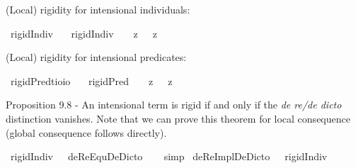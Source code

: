 \begin{isabellebody}
\begin{isamarkuptext}
(Local) rigidity for intensional individuals:%
\end{isamarkuptext}\isamarkuptrue%
\isamarkupfalse%
\ rigidIndiv{\isacharcolon}{\isacharcolon}{\isachardoublequoteopen}{\isasymup}{\isasymlangle}{\isasymup}{\isasymzero}{\isasymrangle}{\isachardoublequoteclose}\ \isanewline
\ \ {\isachardoublequoteopen}rigidIndiv\ {\isasymtau}\ {\isasymequiv}\ {\isacharparenleft}{\isasymlambda}{\isasymbeta}{\isachardot}\ \isactrlbold {\isasymbox}{\isacharparenleft}{\isacharparenleft}{\isasymlambda}z{\isachardot}\ {\isasymbeta}\ \isactrlbold {\isasymapprox}\ z{\isacharparenright}\ \isactrlbold {\isasymdownharpoonleft}{\isasymtau}{\isacharparenright}{\isacharparenright}\ \isactrlbold {\isasymdownharpoonleft}{\isasymtau}{\isachardoublequoteclose}%
\begin{isamarkuptext}%
(Local) rigidity for intensional predicates:%
\end{isamarkuptext}\isamarkuptrue%
\isamarkupfalse%
\ rigidPred{\isacharcolon}{\isacharcolon}{\isachardoublequoteopen}{\isacharparenleft}{\isacharprime}t{\isasymRightarrow}io{\isacharparenright}{\isasymRightarrow}io{\isachardoublequoteclose}\ \isanewline
\ \ {\isachardoublequoteopen}rigidPred\ {\isasymtau}\ {\isasymequiv}\ {\isacharparenleft}{\isasymlambda}{\isasymbeta}{\isachardot}\ \isactrlbold {\isasymbox}{\isacharparenleft}{\isacharparenleft}{\isasymlambda}z{\isachardot}\ {\isasymbeta}\ \isactrlbold {\isasymapprox}\ z{\isacharparenright}\ \isactrlbold {\isasymdown}{\isasymtau}{\isacharparenright}{\isacharparenright}\ \isactrlbold {\isasymdown}{\isasymtau}{\isachardoublequoteclose}%
\begin{isamarkuptext}%
Proposition 9.8 - An intensional term is rigid if and only if the \emph{de re/de dicto} distinction vanishes.
Note that we can prove this theorem for local consequence (global consequence follows directly).%
\end{isamarkuptext}\isamarkuptrue%
\isamarkupfalse%
\ {\isachardoublequoteopen}{\isasymlfloor}rigidIndiv\ {\isacharparenleft}{\isasymtau}{\isacharcolon}{\isacharcolon}{\isasymup}{\isasymzero}{\isacharparenright}\ \isactrlbold {\isasymrightarrow}\ deReEquDeDicto\ {\isasymtau}{\isasymrfloor}{\isachardoublequoteclose}%
\isadelimproof
\ %
\endisadelimproof
%
\isatagproof
{}\isamarkupfalse%
\ simp%
\endisatagproof
{\isafoldproof}%
%
\isadelimproof
%
\endisadelimproof
\isanewline
{}\isamarkupfalse%
\ {\isachardoublequoteopen}{\isasymlfloor}deReImplDeDicto\ {\isacharparenleft}{\isasymtau}{\isacharcolon}{\isacharcolon}{\isasymup}{\isasymzero}{\isacharparenright}\ \isactrlbold {\isasymrightarrow}\ rigidIndiv\ {\isasymtau}{\isasymrfloor}{\isachardoublequoteclose}%

\end{isabellebody}
